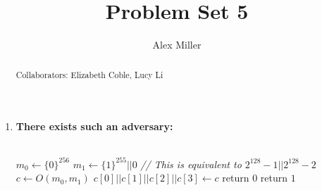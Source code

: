 \documentclass[]{article}
\title{Problem Set 5}
\author{Alex Miller}
\begin{document}
\maketitle

\begin{abstract}
	Collaborators: Elizabeth Coble, Lucy Li
\end{abstract}

\section{}
\subsection{}
\begin{enumerate}[label=(\alph*)]
	\item \textbf{There exists such an adversary:}
	\\\\
	\begin{algorithm}[H]
		\SetAlgoLined
		$m_0 \leftarrow \{0\}^{256}$\;
		$m_1 \leftarrow \{1\}^{255} || 0$ \emph{// This is equivalent to $2^{128} - 1 || 2^{128} - 2$} \;
		$c \leftarrow O(m_0, m_1)$\;
		$c[0] || c[1] || c[2] || c[3] \leftarrow c$\;
		 {
			return $0$
		}
		return $1$
		\caption{$A(\Pi_1)$}
	\end{algorithm}


\end{enumerate}
\end{document}
